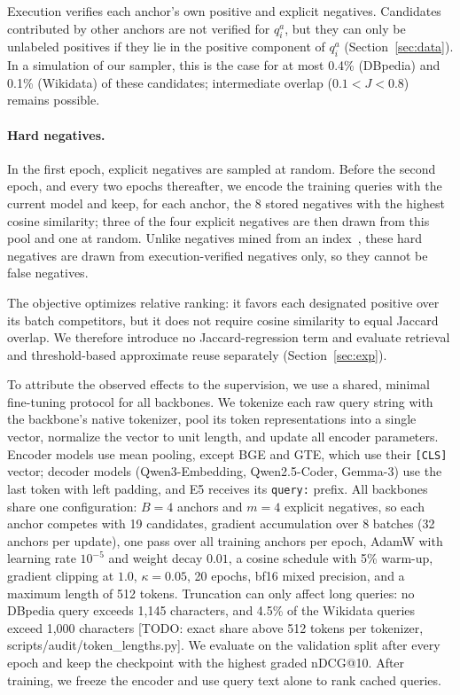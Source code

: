 \documentclass[runningheads]{llncs}
\newcommand{\hp}[1]{{\color{red!75!black}#1}}
\begin{document}
Execution verifies each anchor's own positive and explicit negatives.
Candidates contributed by other anchors are not verified for $q_i^a$, but
they can only be unlabeled positives if they lie in the positive component
of $q_i^a$ (Section~\ref{sec:data}). In a simulation of our sampler, this is
the case for at most 0.4\% (DBpedia) and 0.1\% (Wikidata) of these
candidates; intermediate overlap ($0.1<J<0.8$) remains possible.

\paragraph{Hard negatives.} In the first epoch, explicit negatives are
sampled at random. Before the second epoch, and every two epochs
thereafter, we encode the training queries with the current model and keep,
for each anchor, the 8 stored negatives with the highest cosine similarity;
three of the four explicit negatives are then drawn from this pool and one
at random. Unlike negatives mined from an index~\cite{xiong2021ance}, these
hard negatives are drawn from execution-verified negatives only, so they
cannot be false negatives.

The objective optimizes relative ranking: it favors each designated
positive over its batch competitors, but it does not require cosine
similarity to equal Jaccard overlap. We therefore introduce no
Jaccard-regression term and evaluate retrieval and threshold-based
approximate reuse separately (Section~\ref{sec:exp}).

To attribute the observed effects to the supervision, we use a shared,
minimal fine-tuning protocol for all backbones. We tokenize each raw query
string with the backbone's native tokenizer, pool its token representations
into a single vector, normalize the vector to unit length, and update all
encoder parameters.
Encoder models use mean pooling, except BGE and GTE, which use their
\texttt{[CLS]} vector; decoder models (Qwen3-Embedding, Qwen2.5-Coder,
Gemma-3) use the last token with left padding, and E5 receives its
\texttt{query:} prefix. All backbones share one configuration: $B=4$ anchors and $m=4$ explicit
negatives, so each anchor competes with 19 candidates, gradient accumulation
over 8 batches (32 anchors per update), one pass over all training anchors
per epoch, AdamW with
learning rate $10^{-5}$ and weight decay $0.01$, a cosine schedule with 5\%
warm-up, gradient clipping at $1.0$, $\kappa = 0.05$, 20 epochs, bf16 mixed
precision, and a maximum length of 512 tokens. Truncation can only affect long queries: no DBpedia query exceeds 1{,}145
characters, and 4.5\% of the Wikidata queries exceed 1{,}000 characters
\hp{[TODO: exact share above 512 tokens per tokenizer, scripts/audit/token\_lengths.py]}. We evaluate on the validation split after every
epoch and keep the checkpoint with the highest graded nDCG@10.
After training, we freeze the encoder and use query text alone to
rank cached queries.
\end{document}
